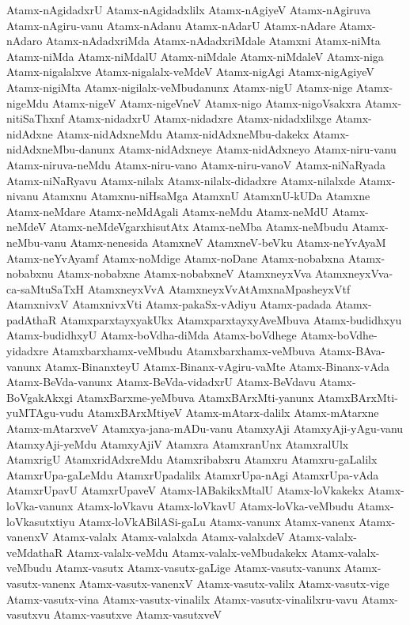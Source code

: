 {Atamx-nAgidadxrU
Atamx-nAgidadxlilx
Atamx-nAgiyeV
Atamx-nAgiruva
Atamx-nAgiru-vanu
Atamx-nAdanu
Atamx-nAdarU
Atamx-nAdare
Atamx-nAdaro
Atamx-nAdadxriMda
Atamx-nAdadxriMdale
Atamxni
Atamx-niMta
Atamx-niMda
Atamx-niMdalU
Atamx-niMdale
Atamx-niMdaleV
Atamx-niga
Atamx-nigalalxve
Atamx-nigalalx-veMdeV
Atamx-nigAgi
Atamx-nigAgiyeV
Atamx-nigiMta
Atamx-nigilalx-veMbudanunx
Atamx-nigU
Atamx-nige
Atamx-nigeMdu
Atamx-nigeV
Atamx-nigeVneV
Atamx-nigo
Atamx-nigoVsakxra
Atamx-nitiSaThxnf
Atamx-nidadxrU
Atamx-nidadxre
Atamx-nidadxlilxge
Atamx-nidAdxne
Atamx-nidAdxneMdu
Atamx-nidAdxneMbu-dakekx
Atamx-nidAdxneMbu-danunx
Atamx-nidAdxneye
Atamx-nidAdxneyo
Atamx-niru-vanu
Atamx-niruva-neMdu
Atamx-niru-vano
Atamx-niru-vanoV
Atamx-niNaRyada
Atamx-niNaRyavu
Atamx-nilalx
Atamx-nilalx-didadxre
Atamx-nilalxde
Atamx-nivanu
Atamxnu
Atamxnu-niHsaMga
AtamxnU
AtamxnU-kUDa
Atamxne
Atamx-neMdare
Atamx-neMdAgali
Atamx-neMdu
Atamx-neMdU
Atamx-neMdeV
Atamx-neMdeVgarxhisutAtx
Atamx-neMba
Atamx-neMbudu
Atamx-neMbu-vanu
Atamx-nenesida
AtamxneV
AtamxneV-beVku
Atamx-neYvAyaM
Atamx-neYvAyamf
Atamx-noMdige
Atamx-noDane
Atamx-nobabxna
Atamx-nobabxnu
Atamx-nobabxne
Atamx-nobabxneV
AtamxneyxVva
AtamxneyxVva-ca-saMtuSaTxH
AtamxneyxVvA
AtamxneyxVvAtAmxnaMpasheyxVtf
AtamxnivxV
AtamxnivxVti
Atamx-pakaSx-vAdiyu
Atamx-padada
Atamx-padAthaR
AtamxparxtayxyakUkx
AtamxparxtayxyAveMbuva
Atamx-budidhxyu
Atamx-budidhxyU
Atamx-boVdha-diMda
Atamx-boVdhege
Atamx-boVdhe-yidadxre
Atamxbarxhamx-veMbudu
Atamxbarxhamx-veMbuva
Atamx-BAva-vanunx
Atamx-BinanxteyU
Atamx-Binanx-vAgiru-vaMte
Atamx-Binanx-vAda
Atamx-BeVda-vanunx
Atamx-BeVda-vidadxrU
Atamx-BeVdavu
Atamx-BoVgakAkxgi
AtamxBarxme-yeMbuva
AtamxBArxMti-yanunx
AtamxBArxMti-yuMTAgu-vudu
AtamxBArxMtiyeV
Atamx-mAtarx-dalilx
Atamx-mAtarxne
Atamx-mAtarxveV
Atamxya-jana-mADu-vanu
AtamxyAji
AtamxyAji-yAgu-vanu
AtamxyAji-yeMdu
AtamxyAjiV
Atamxra
AtamxranUnx
AtamxralUlx
AtamxrigU
AtamxridAdxreMdu
Atamxribabxru
Atamxru
Atamxru-gaLalilx
AtamxrUpa-gaLeMdu
AtamxrUpadalilx
AtamxrUpa-nAgi
AtamxrUpa-vAda
AtamxrUpavU
AtamxrUpaveV
Atamx-lABakikxMtalU
Atamx-loVkakekx
Atamx-loVka-vanunx
Atamx-loVkavu
Atamx-loVkavU
Atamx-loVka-veMbudu
Atamx-loVkasutxtiyu
Atamx-loVkABilASi-gaLu
Atamx-vanunx
Atamx-vanenx
Atamx-vanenxV
Atamx-valalx
Atamx-valalxda
Atamx-valalxdeV
Atamx-valalx-veMdathaR
Atamx-valalx-veMdu
Atamx-valalx-veMbudakekx
Atamx-valalx-veMbudu
Atamx-vasutx
Atamx-vasutx-gaLige
Atamx-vasutx-vanunx
Atamx-vasutx-vanenx
Atamx-vasutx-vanenxV
Atamx-vasutx-valilx
Atamx-vasutx-vige
Atamx-vasutx-vina
Atamx-vasutx-vinalilx
Atamx-vasutx-vinalilxru-vavu
Atamx-vasutxvu
Atamx-vasutxve
Atamx-vasutxveV
}
